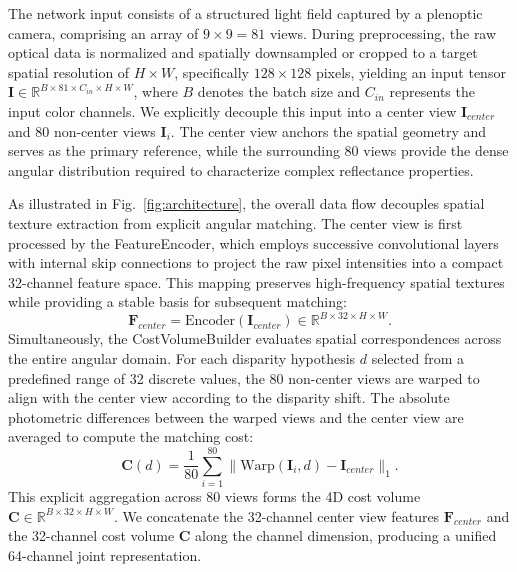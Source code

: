 \documentclass[lettersize,journal]{IEEEtran}
\begin{document}
The network input consists of a structured light field captured by a plenoptic camera, comprising an array of $9 \times 9 = 81$ views. During preprocessing, the raw optical data is normalized and spatially downsampled or cropped to a target spatial resolution of $H \times W$, specifically $128 \times 128$ pixels, yielding an input tensor $\mathbf{I} \in \mathbb{R}^{B \times 81 \times C_{in} \times H \times W}$, where $B$ denotes the batch size and $C_{in}$ represents the input color channels. We explicitly decouple this input into a center view $\mathbf{I}_{center}$ and 80 non-center views $\mathbf{I}_{i}$. The center view anchors the spatial geometry and serves as the primary reference, while the surrounding 80 views provide the dense angular distribution required to characterize complex reflectance properties. 

As illustrated in Fig.~\ref{fig:architecture}, the overall data flow decouples spatial texture extraction from explicit angular matching. The center view is first processed by the FeatureEncoder, which employs successive convolutional layers with internal skip connections to project the raw pixel intensities into a compact 32-channel feature space. This mapping preserves high-frequency spatial textures while providing a stable basis for subsequent matching:
\begin{equation}
\mathbf{F}_{center} = \text{Encoder}(\mathbf{I}_{center}) \in \mathbb{R}^{B \times 32 \times H \times W}.
\end{equation}
Simultaneously, the CostVolumeBuilder evaluates spatial correspondences across the entire angular domain. For each disparity hypothesis $d$ selected from a predefined range of 32 discrete values, the 80 non-center views are warped to align with the center view according to the disparity shift. The absolute photometric differences between the warped views and the center view are averaged to compute the matching cost:
\begin{equation}
\mathbf{C}(d) = \frac{1}{80} \sum_{i=1}^{80} \|\text{Warp}(\mathbf{I}_{i}, d) - \mathbf{I}_{center}\|_1.
\end{equation}
This explicit aggregation across 80 views forms the 4D cost volume $\mathbf{C} \in \mathbb{R}^{B \times 32 \times H \times W}$. We concatenate the 32-channel center view features $\mathbf{F}_{center}$ and the 32-channel cost volume $\mathbf{C}$ along the channel dimension, producing a unified 64-channel joint representation. 
\end{document}
